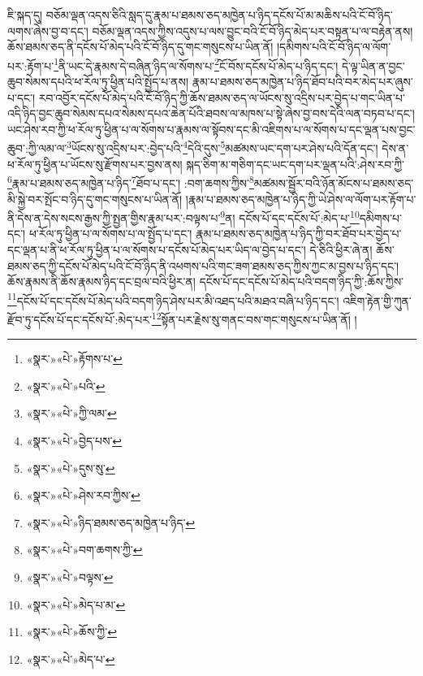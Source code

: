 ཇི་སྐད་དུ། བཅོམ་ལྡན་འདས་ཅིའི་སླད་དུ་རྣམ་པ་ཐམས་ཅད་མཁྱེན་པ་ཉིད་དངོས་པོ་མ་མཆིས་པའི་ངོ་བོ་ཉིད་ལགས་ཞེས་བྱ་བ་དང་། བཅོམ་ལྡན་འདས་ཀྱིས་འདུས་པ་ལས་བྱུང་བའི་ངོ་བོ་ཉིད་མེད་པར་བསྟན་པ་ལ་བརྟེན་ནས། ཆོས་ཐམས་ཅད་ནི་དངོས་པོ་མེད་པའི་ངོ་བོ་ཉིད་དུ་གང་གསུངས་པ་ཡིན་ནོ། །དམིགས་པའི་ངོ་བོ་ཉིད་ལ་ལོག་པར་:རྟོག་པ་\footnote{«སྣར་»«པེ་»རྟོགས་པ་}ནི་ཡང་དེ་རྣམས་དེ་བཞིན་ཉིད་ལ་སོགས་པ་\footnote{«སྣར་»«པེ་»པའི་}ངོ་བོས་དངོས་པོ་མེད་པ་ཉིད་དང་། དེ་ལྟ་ཡིན་ན་བྱང་ཆུབ་སེམས་དཔའི་ཕ་རོལ་ཏུ་ཕྱིན་པའི་སྤྱོད་པ་ནས། རྣམ་པ་ཐམས་ཅད་མཁྱེན་པ་ཉིད་ཐོབ་པའི་བར་མེད་པར་ཞུས་པ་དང་། རབ་འབྱོར་དངོས་པོ་མེད་པའི་ངོ་བོ་ཉིད་ཀྱི་ཆོས་ཐམས་ཅད་ལ་ཡོངས་སུ་འདྲིས་པར་བྱེད་པ་གང་ཡིན་པ་འདི་ཉིད་བྱང་ཆུབ་སེམས་དཔའ་སེམས་དཔའ་ཆེན་པོའི་ཐབས་ལ་མཁས་པ་སྟེ་ཞེས་བྱ་བས་དེའི་ལན་བཏབ་པ་དང་། ཡང་ཤེས་རབ་ཀྱི་ཕ་རོལ་ཏུ་ཕྱིན་པ་ལ་སོགས་པ་རྣམས་ལ་སྟོབས་དང་མི་འཇིགས་པ་ལ་སོགས་པ་དང་ལྡན་པས་བྱང་ཆུབ་:ཀྱི་ལམ་ལ་\footnote{«སྣར་»«པེ་»ཀྱི་ལམ་}ཡོངས་སུ་འདྲིས་པར་:བྱེད་པའི་\footnote{«སྣར་»«པེ་»བྱེད་པས་}དེའི་དུས་\footnote{«སྣར་»«པེ་»དུས་སུ་}མཚམས་ཡང་དག་པར་ཤེས་པའི་དོན་དང་། དེས་ན་ཕ་རོལ་ཏུ་ཕྱིན་པ་ཡོངས་སུ་རྫོགས་པར་བྱས་ནས། སྐད་ཅིག་མ་གཅིག་དང་ཡང་དག་པར་ལྡན་པའི་:ཤེས་རབ་ཀྱི་\footnote{«སྣར་»«པེ་»ཤེས་རབ་ཀྱིས་}རྣམ་པ་ཐམས་ཅད་མཁྱེན་པ་ཉིད་\footnote{«སྣར་»«པེ་»ཉིད་ཐམས་ཅད་མཁྱེན་པ་ཉིད་}ཐོབ་པ་དང་། :བག་ཆགས་ཀྱིས་\footnote{«སྣར་»«པེ་»བག་ཆགས་ཀྱི་}མཚམས་སྦྱོར་བའི་ཉོན་མོངས་པ་ཐམས་ཅད་མི་སྐྱེ་བར་སྤོང་བ་ཉིད་དུ་གང་གསུངས་པ་ཡིན་ནོ། །རྣམ་པ་ཐམས་ཅད་མཁྱེན་པ་ཉིད་ཀྱི་ཡེ་ཤེས་ལ་ལོག་པར་རྟོག་པ་ནི་དེས་ན་དེས་སངས་རྒྱས་ཀྱི་སྤྱན་གྱིས་རྣམ་པར་:བལྟས་པ་\footnote{«སྣར་»«པེ་»བལྟས་}ན། དངོས་པོ་དང་དངོས་པོ་:མེད་པ་\footnote{«སྣར་»«པེ་»མེད་པ་མ་}དམིགས་པ་དང་། ཕ་རོལ་ཏུ་ཕྱིན་པ་ལ་སོགས་པ་ལ་སྤྱོད་པ་དང་། རྣམ་པ་ཐམས་ཅད་མཁྱེན་པ་ཉིད་ཀྱི་བར་ཐོབ་པར་བྱེད་པ་དང་ལྡན་པ་ནི་ཕ་རོལ་ཏུ་ཕྱིན་པ་ལ་སོགས་པ་དངོས་པོ་མེད་པར་ཡིད་ལ་བྱེད་པ་དང་། དེ་ཅིའི་ཕྱིར་ཞེ་ན། ཆོས་ཐམས་ཅད་ཀྱི་དངོས་པོ་མེད་པའི་ངོ་བོ་ཉིད་ནི་འཕགས་པའི་གང་ཟག་ཐམས་ཅད་ཀྱིས་ཀྱང་མ་བྱས་པ་ཉིད་དང་། ཆོས་རྣམས་ནི་ཆོས་རྣམས་ཉིད་དང་བྲལ་བའི་ཕྱིར་ན། དངོས་པོ་དང་དངོས་པོ་མེད་པའི་བདག་ཉིད་ཀྱི་:ཆོས་ཀྱིས་\footnote{«སྣར་»«པེ་»ཆོས་ཀྱི་}དངོས་པོ་དང་དངོས་པོ་མེད་པའི་བདག་ཉིད་ཤེས་པར་མི་འཐད་པའི་མཐའ་བཞི་པ་ཉིད་དང་། འཇིག་རྟེན་གྱི་ཀུན་རྫོབ་ཏུ་དངོས་པོ་དང་དངོས་པོ་:མེད་པར་\footnote{«སྣར་»«པེ་»མེད་པ་}སྟོན་པར་རྗེས་སུ་གནང་བས་གང་གསུངས་པ་ཡིན་ནོ། །
